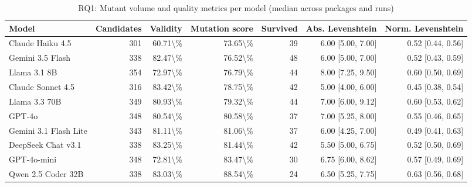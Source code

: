 \begin{table}[htbp]
\centering
{\small
\begin{tabular}{l|rrrrrr}
\toprule
\textbf{Model} & \textbf{Candidates} & \textbf{Validity} & \textbf{Mutation score} & \textbf{Survived} & \textbf{Abs. Levenshtein} & \textbf{Norm. Levenshtein} \\
\midrule
Claude Haiku 4.5 & 301 & 60.71\textbackslash{}\% & 73.65\textbackslash{}\% & 39 & 6.00 [5.00, 7.00] & 0.52 [0.44, 0.56] \\
Gemini 3.5 Flash & 338 & 82.47\textbackslash{}\% & 76.52\textbackslash{}\% & 48 & 6.00 [5.00, 7.00] & 0.52 [0.43, 0.59] \\
Llama 3.1 8B & 354 & 72.97\textbackslash{}\% & 76.79\textbackslash{}\% & 44 & 8.00 [7.25, 9.50] & 0.60 [0.50, 0.69] \\
Claude Sonnet 4.5 & 316 & 83.42\textbackslash{}\% & 78.75\textbackslash{}\% & 42 & 5.00 [4.00, 6.00] & 0.45 [0.38, 0.54] \\
Llama 3.3 70B & 349 & 80.93\textbackslash{}\% & 79.32\textbackslash{}\% & 44 & 7.00 [6.00, 9.12] & 0.60 [0.53, 0.62] \\
GPT-4o & 348 & 80.54\textbackslash{}\% & 80.58\textbackslash{}\% & 37 & 7.00 [5.25, 8.00] & 0.55 [0.46, 0.65] \\
Gemini 3.1 Flash Lite & 343 & 81.11\textbackslash{}\% & 81.06\textbackslash{}\% & 37 & 6.00 [4.25, 7.00] & 0.49 [0.41, 0.63] \\
DeepSeek Chat v3.1 & 338 & 83.25\textbackslash{}\% & 81.44\textbackslash{}\% & 42 & 5.50 [5.00, 6.75] & 0.52 [0.50, 0.69] \\
GPT-4o-mini & 348 & 72.81\textbackslash{}\% & 83.47\textbackslash{}\% & 30 & 6.75 [6.00, 8.62] & 0.57 [0.49, 0.69] \\
Qwen 2.5 Coder 32B & 338 & 83.03\textbackslash{}\% & 88.54\textbackslash{}\% & 24 & 6.50 [5.25, 7.75] & 0.63 [0.56, 0.68] \\
\bottomrule
\end{tabular}
}
\caption{RQ1: Mutant volume and quality metrics per model (median across packages and runs)}
\label{tab:rq1-volume}
\end{table}